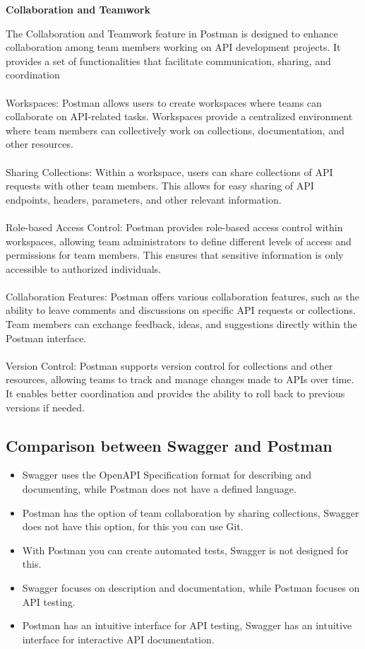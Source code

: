 \documentclass[twoside,twocolumn]{article}
\begin{document}
 \textbf{Collaboration and Teamwork}
  
 The Collaboration and Teamwork feature in Postman is designed to enhance collaboration among team members working on API development projects. It provides a set of functionalities that facilitate communication, sharing, and coordination
 \\ \\
 Workspaces: Postman allows users to create workspaces where teams can collaborate on API-related tasks. Workspaces provide a centralized environment where team members can collectively work on collections, documentation, and other resources.
 \\ \\
Sharing Collections: Within a workspace, users can share collections of API requests with other team members. This allows for easy sharing of API endpoints, headers, parameters, and other relevant information.
 \\ \\
Role-based Access Control: Postman provides role-based access control within workspaces, allowing team administrators to define different levels of access and permissions for team members. This ensures that sensitive information is only accessible to authorized individuals.
 \\ \\
Collaboration Features: Postman offers various collaboration features, such as the ability to leave comments and discussions on specific API requests or collections. Team members can exchange feedback, ideas, and suggestions directly within the Postman interface.
 \\ \\
Version Control: Postman supports version control for collections and other resources, allowing teams to track and manage changes made to APIs over time. It enables better coordination and provides the ability to roll back to previous versions if needed.

\subsection{Comparison between Swagger and Postman}
\begin{itemize}	
	\item  Swagger uses the OpenAPI Specification format for describing and documenting, while Postman does not have a defined language.
	\item Postman has the option of team collaboration by sharing collections, Swagger does not have this option, for this you can use Git.
	\item With Postman you can create automated tests, Swagger is not designed for this.
	\item Swagger focuses on description and documentation, while Postman focuses on API testing.
        \item Postman has an intuitive interface for API testing, Swagger has an intuitive interface for interactive API documentation.
\end{itemize}
\end{document}
